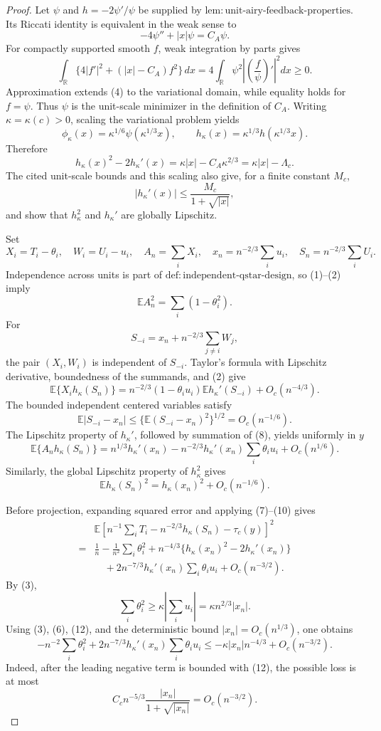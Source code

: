 \documentclass{article}
\begin{document}
\begin{proof}
Let \(\psi\) and \(h=-2\psi'/\psi\) be supplied by
\(\mathrm{lem:unit\text{-}airy\text{-}feedback\text{-}properties}\).
Its Riccati identity is equivalent in the weak sense to
\[
-4\psi''+|x|\psi=C_A\psi.
\]
For compactly supported smooth \(f\), weak integration by parts gives
\[
\int_{\mathbb R}\{4|f'|^2+(|x|-C_A)f^2\}\,dx
=4\int_{\mathbb R}\psi^2
\left|\left(\frac f\psi\right)'\right|^2dx\ge0.
\tag{4}
\]
Approximation extends (4) to the variational domain, while equality holds for \(f=\psi\).  Thus \(\psi\) is the unit-scale minimizer in the definition of \(C_A\).  Writing \(\kappa=\kappa(c)>0\), scaling the variational problem yields
\[
\phi_\kappa(x)=\kappa^{1/6}\psi(\kappa^{1/3}x),
\qquad
h_\kappa(x)=\kappa^{1/3}h(\kappa^{1/3}x).
\]
Therefore
\[
h_\kappa(x)^2-2h_\kappa'(x)
=\kappa|x|-C_A\kappa^{2/3}
=\kappa|x|-\Lambda_c.
\tag{5}
\]
The cited unit-scale bounds and this scaling also give, for a finite constant \(M_c\),
\[
|h_\kappa'(x)|\le\frac{M_c}{1+\sqrt{|x|}},
\tag{6}
\]
and show that \(h_\kappa^2\) and \(h_\kappa'\) are globally Lipschitz.

Set
\[
X_i=T_i-\theta_i,\quad W_i=U_i-u_i,\quad
A_n=\sum_iX_i,\quad x_n=n^{-2/3}\sum_i u_i,\quad
S_n=n^{-2/3}\sum_iU_i.
\]
Independence across units is part of
\(\mathrm{def:independent\text{-}qstar\text{-}design}\), so (1)--(2) imply
\[
\mathbb EA_n^2=\sum_i(1-\theta_i^2).
\tag{7}
\]
For
\[
S_{-i}=x_n+n^{-2/3}\sum_{j\ne i}W_j,
\]
the pair \((X_i,W_i)\) is independent of \(S_{-i}\).  Taylor's formula with Lipschitz derivative, boundedness of the summands, and (2) give
\[
\mathbb E\{X_ih_\kappa(S_n)\}
=n^{-2/3}(1-\theta_iu_i)\mathbb Eh_\kappa'(S_{-i})
+O_c(n^{-4/3}).
\tag{8}
\]
The bounded independent centered variables satisfy
\[
\mathbb E|S_{-i}-x_n|
\le\{\mathbb E(S_{-i}-x_n)^2\}^{1/2}=O_c(n^{-1/6}).
\]
The Lipschitz property of \(h_\kappa'\), followed by summation of (8), yields uniformly in \(y\)
\[
\mathbb E\{A_nh_\kappa(S_n)\}
=n^{1/3}h_\kappa'(x_n)
-n^{-2/3}h_\kappa'(x_n)\sum_i\theta_iu_i
+O_c(n^{1/6}).
\tag{9}
\]
Similarly, the global Lipschitz property of \(h_\kappa^2\) gives
\[
\mathbb Eh_\kappa(S_n)^2
=h_\kappa(x_n)^2+O_c(n^{-1/6}).
\tag{10}
\]

Before projection, expanding squared error and applying (7)--(10) gives
\[
\begin{split}
&\mathbb E\left[
n^{-1}\sum_iT_i-n^{-2/3}h_\kappa(S_n)-\tau_c(y)
\right]^2\\
={}&\frac1n-\frac1{n^2}\sum_i\theta_i^2
+n^{-4/3}\{h_\kappa(x_n)^2-2h_\kappa'(x_n)\}\\
&\quad
+2n^{-7/3}h_\kappa'(x_n)\sum_i\theta_iu_i
+O_c(n^{-3/2}).
\end{split}
\tag{11}
\]
By (3),
\[
\sum_i\theta_i^2
\ge\kappa\left|\sum_i u_i\right|
=\kappa n^{2/3}|x_n|.
\tag{12}
\]
Using (3), (6), (12), and the deterministic bound
\(|x_n|=O_c(n^{1/3})\), one obtains
\[
-n^{-2}\sum_i\theta_i^2
+2n^{-7/3}h_\kappa'(x_n)\sum_i\theta_iu_i
\le-\kappa|x_n|n^{-4/3}+O_c(n^{-3/2}).
\tag{13}
\]
Indeed, after the leading negative term is bounded with (12), the possible loss is at most
\[
C_cn^{-5/3}\frac{|x_n|}{1+\sqrt{|x_n|}}
=O_c(n^{-3/2}).
\]


\end{proof}
\end{document}
